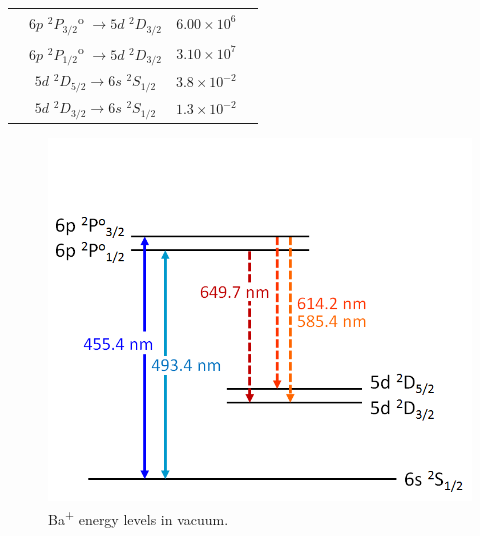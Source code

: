 \begin{table}[!htbp]
\begin{tabular}{c|c|c c}
& $6p$ $^{2}P_{3/2}$\textsuperscript{o} $\rightarrow 5d$ $^{2}D_{3/2}$ & $6.00 \times 10^{6}$ & \cite{BaAllowedTransitions} \\
& $6p$ $^{2}P_{1/2}$\textsuperscript{o} $\rightarrow 5d$ $^{2}D_{3/2}$ & $3.10 \times 10^{7}$ & \cite{BaAllowedTransitions} \\
& $5d$ $^{2}D_{5/2} \rightarrow 6s$ $^{2}S_{1/2}$ & $3.8 \times 10^{-2}$ & \cite{BaPlusD52} \\
& $5d$ $^{2}D_{3/2} \rightarrow 6s$ $^{2}S_{1/2}$ & $1.3 \times 10^{-2}$ & \cite{BaPlusD32} \\
\end{tabular}
\end{table}

\begin{figure} %
	\includegraphics[width=.6\textwidth]{figures/elevs_Ba+_separate.png}
	\caption{Ba\textsuperscript{+} energy levels in vacuum.}
    \label{fig:elevsBaPlus}
\end{figure}



